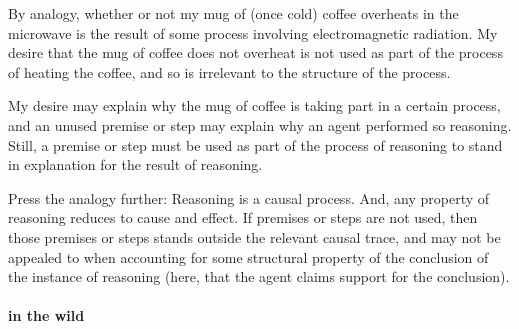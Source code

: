 \begin{note}[Analogy]
  By analogy, whether or not my mug of (once cold) coffee overheats in the microwave is the result of some process involving electromagnetic radiation.
  My desire that the mug of coffee does not overheat is not used as part of the process of heating the coffee, and so is irrelevant to the structure of the process.

  My desire may explain why the mug of coffee is taking part in a certain process, and an unused premise or step may explain why an agent performed so reasoning.
  Still, a premise or step must be used as part of the process of reasoning to stand in explanation for the result of reasoning.

  Press the analogy further: Reasoning is a causal process.
  And, any property of reasoning reduces to cause and effect.
  If premises or steps are not used, then those premises or steps stands outside the relevant causal trace, and may not be appealed to when accounting for some structural property of the conclusion of the instance of reasoning (here, that the agent claims support for the conclusion).
\end{note}

\paragraph{\ESU{} in the wild}

